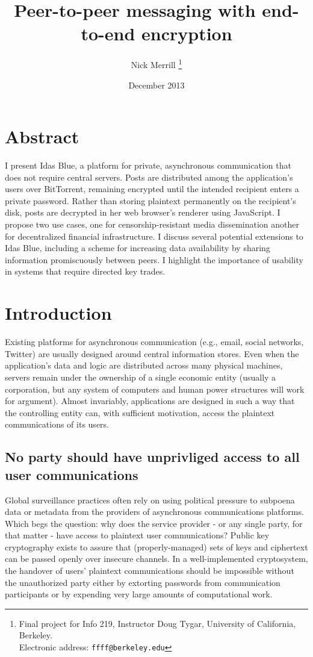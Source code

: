 \documentclass{article}
\title{Peer-to-peer messaging with end-to-end encryption}
\author{Nick Merrill%
	\thanks{Final project for Info 219, Instructor Doug Tygar, University of California, Berkeley.\\ Electronic address: \texttt{ffff@berkeley.edu}}}
\affil{School of Information, University of California, Berkeley}
\date{December 2013}
\begin{document}
   \maketitle

\section{Abstract}
I present Idas Blue, a platform for private, asynchronous communication that does not require central servers. Posts are distributed among the application's users over BitTorrent, remaining encrypted until the intended recipient enters a private password. Rather than storing plaintext permanently on the recipient's disk, posts are decrypted in her web browser's renderer using JavaScript. I propose two use cases, one for censorship-resistant media dissemination another for decentralized financial infrastructure. I discuss several potential extensions to Idas Blue, including a scheme for increasing data availability by sharing information promiscuously between peers. I highlight the importance of usability in systems that require directed key trades.

\section{Introduction}
Existing platforms for asynchronous communication (e.g., email, social networks, Twitter) are usually designed around central information stores. Even when the application's data and logic are distributed across many physical machines, servers remain under the ownership of a single economic entity (usually a corporation, but any system of computers and human power structures will work for argument). Almost invariably, applications are designed in such a way that the controlling entity can, with sufficient motivation, access the plaintext communications of its users.

\subsection{No party should have unprivliged access to all user communications}
Global surveillance practices often rely on using political pressure to subpoena data or metadata from the providers of asynchronous communications platforms. Which begs the question: why does the service provider - or any single party, for that matter - have access to plaintext user communications? Public key cryptography exists to assure that (properly-managed) sets of keys and ciphertext can be passed openly over insecure channels. In a well-implemented cryptosystem, the handover of users' plaintext communications should be impossible without the unauthorized party either by extorting passwords from communication participants or by expending very large amounts of computational work. 
\end{document}

